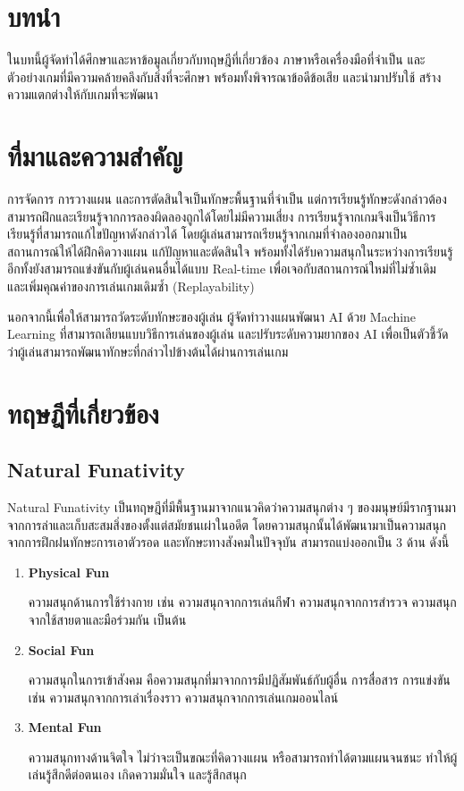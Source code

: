 \documentclass[12pt,oneside,openright,a4paper]{cpe-thai-project}
\begin{document}
\section{บทนำ}
ในบทนี้ผู้จัดทำได้ศึกษาและหาข้อมูลเกี่ยวกับทฤษฎีที่เกี่ยวข้อง 
ภาษาหรือเครื่องมือที่จำเป็น และตัวอย่างเกมที่มีความคล้ายคลึงกับสิ่งที่จะศึกษา 
พร้อมทั้งพิจารณาข้อดีข้อเสีย และนำมาปรับใช้ สร้างความแตกต่างให้กับเกมที่จะพัฒนา


\section{ที่มาและความสำคัญ}

การจัดการ การวางแผน และการตัดสินใจเป็นทักษะพื้นฐานที่จำเป็น 
แต่การเรียนรู้ทักษะดังกล่าวต้องสามารถฝึกและเรียนรู้จากการลองผิดลองถูกได้โดยไม่มีความเสี่ยง 
การเรียนรู้จากเกมจึงเป็นวิธีการเรียนรู้ที่สามารถแก้ไขปัญหาดังกล่าวได้ 
โดยผู้เล่นสามารถเรียนรู้จากเกมที่จำลองออกมาเป็นสถานการณ์ให้ได้ฝึกคิดวางแผน 
แก้ปัญหาและตัดสินใจ พร้อมทั้งได้รับความสนุกในระหว่างการเรียนรู้ 
อีกทั้งยังสามารถแข่งขันกับผู้เล่นคนอื่นได้แบบ Real-time เพื่อเจอกับสถานการณ์ใหม่ที่ไม่ซ้ำเดิม 
และเพิ่มคุณค่าของการเล่นเกมเดิมซ้ำ (Replayability)

นอกจากนี้เพื่อให้สามารถวัดระดับทักษะของผู้เล่น ผู้จัดทำวางแผนพัฒนา AI ด้วย Machine Learning 
ที่สามารถเลียนแบบวิธีการเล่นของผู้เล่น และปรับระดับความยากของ AI 
เพื่อเป็นตัวชี้วัดว่าผู้เล่นสามารถพัฒนาทักษะที่กล่าวไปข้างต้นได้ผ่านการเล่นเกม


\section{ทฤษฎีที่เกี่ยวข้อง}

\subsection{Natural Funativity \cite{natfun05}}
Natural Funativity เป็นทฤษฎีที่มีพื้นฐานมาจากแนวคิดว่าความสนุกต่าง ๆ 
ของมนุษย์มีรากฐานมาจากการล่าและเก็บสะสมสิ่งของตั้งแต่สมัยชนเผ่าในอดีต 
โดยความสนุกนั้นได้พัฒนามาเป็นความสนุกจากการฝึกฝนทักษะการเอาตัวรอด
และทักษะทางสังคมในปัจจุบัน สามารถแบ่งออกเป็น 3 ด้าน ดังนี้

\begin{enumerate}
  \item \textbf{Physical Fun}
  
  ความสนุกด้านการใช้ร่างกาย เช่น ความสนุกจากการเล่นกีฬา 
  ความสนุกจากการสำรวจ ความสนุกจากใช้สายตาและมือร่วมกัน เป็นต้น
  
  \item \textbf{Social Fun}
  
  ความสนุกในการเข้าสังคม คือความสนุกที่มาจากการมีปฏิสัมพันธ์กับผู้อื่น 
  การสื่อสาร การแข่งขัน เช่น ความสนุกจากการเล่าเรื่องราว 
  ความสนุกจากการเล่นเกมออนไลน์
  
  \item \textbf{Mental Fun}
  
  ความสนุกทางด้านจิตใจ ไม่ว่าจะเป็นขณะที่คิดวางแผน 
  หรือสามารถทำได้ตามแผนจนชนะ ทำให้ผู้เล่นรู้สึกดีต่อตนเอง 
  เกิดความมั่นใจ และรู้สึกสนุก
\end{enumerate}
\end{document}
